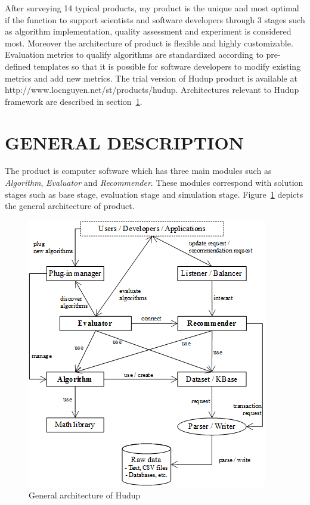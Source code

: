 \documentclass[a4paper,twoside]{article}
\begin{document}
After surveying 14 typical products, my product is the unique and most optimal if the function to support scientists and software developers through 3 stages such as algorithm implementation, quality assessment and experiment is considered most. Moreover the architecture of product is flexible and highly customizable. Evaluation metrics to qualify algorithms are standardized according to pre-defined templates so that it is possible for software developers to modify existing metrics and add new metrics. The trial version of Hudup product is available at http://www.locnguyen.net/st/products/hudup. Architectures relevant to Hudup framework are described in section~\ref{sec:description}.

\section{\uppercase{General Description}}
\label{sec:description}
The product is computer software which has three main modules such as \textit{Algorithm}, \textit{Evaluator} and \textit{Recommender}. These modules correspond with solution stages such as base stage, evaluation stage and simulation stage. Figure~\ref{figure:general-architecture} depicts the general architecture of product.
\begin{figure}
\centering
\includegraphics{CompoundGeneralArchitecture.png}
\caption{General architecture of Hudup}
\label{figure:general-architecture}
\end{figure}
\end{document}

